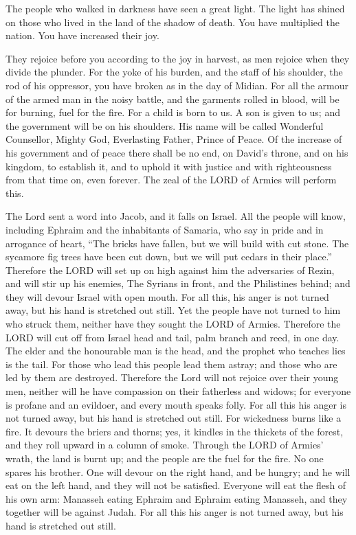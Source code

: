  The people who walked in darkness have seen a great light.
The light has shined on those who lived in the land of the shadow of
death.  You have multiplied the nation. You have increased
their joy.

They rejoice before you according to the joy in harvest, as men rejoice
when they divide the plunder.  For the yoke of his burden,
and the staff of his shoulder, the rod of his oppressor, you have broken
as in the day of Midian.  For all the armour of the armed
man in the noisy battle, and the garments rolled in blood, will be for
burning, fuel for the fire.  For a child is born to us. A
son is given to us; and the government will be on his shoulders. His
name will be called Wonderful Counsellor, Mighty God, Everlasting
Father, Prince of Peace.  Of the increase of his government
and of peace there shall be no end, on David's throne, and on his
kingdom, to establish it, and to uphold it with justice and with
righteousness from that time on, even forever. The zeal of the LORD of
Armies will perform this.

 The Lord sent a word into Jacob, and it falls on Israel.
 All the people will know, including Ephraim and the
inhabitants of Samaria, who say in pride and in arrogance of heart,
 ``The bricks have fallen, but we will build with cut
stone. The sycamore fig trees have been cut down, but we will put cedars
in their place.''  Therefore the LORD will set up on high
against him the adversaries of Rezin, and will stir up his enemies,
 The Syrians in front, and the Philistines behind; and they
will devour Israel with open mouth. For all this, his anger is not
turned away, but his hand is stretched out still.  Yet the
people have not turned to him who struck them, neither have they sought
the LORD of Armies.  Therefore the LORD will cut off from
Israel head and tail, palm branch and reed, in one day. 
The elder and the honourable man is the head, and the prophet who
teaches lies is the tail.  For those who lead this people
lead them astray; and those who are led by them are destroyed.
 Therefore the Lord will not rejoice over their young men,
neither will he have compassion on their fatherless and widows; for
everyone is profane and an evildoer, and every mouth speaks folly. For
all this his anger is not turned away, but his hand is stretched out
still.  For wickedness burns like a fire. It devours the
briers and thorns; yes, it kindles in the thickets of the forest, and
they roll upward in a column of smoke.  Through the LORD of
Armies' wrath, the land is burnt up; and the people are the fuel for the
fire. No one spares his brother.  One will devour on the
right hand, and be hungry; and he will eat on the left hand, and they
will not be satisfied. Everyone will eat the flesh of his own arm:
 Manasseh eating Ephraim and Ephraim eating Manasseh, and
they together will be against Judah. For all this his anger is not
turned away, but his hand is stretched out still.

